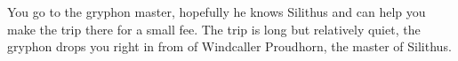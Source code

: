 

You go to the gryphon master, hopefully he knows Silithus and can help you make the trip there for a small fee. The trip is long but relatively quiet, the gryphon drops you right in from of Windcaller Proudhorn, the master of Silithus.


